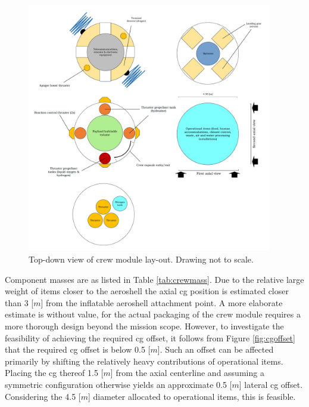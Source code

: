 \begin{figure}[ht]
		\centering
		\includegraphics[width=0.95\textwidth]{./Figure/CrewModule/TopviewV2.pdf}
		\caption[Top-down view of crew module lay-out]{Top-down view of crew module lay-out. Drawing not to scale.}
		\label{fig:topview}
\end{figure}

Component masses are as listed in Table \ref{tab:crewmass}. Due to the relative large weight of items closer to the aeroshell the axial \gls{cg} position is estimated closer than 3 [$m$] from the inflatable aeroshell attachment point. A more elaborate estimate is without value, for the actual packaging of the crew module requires a more thorough design beyond the mission scope. However, to investigate the feasibility of achieving the required \gls{cg} offset, it follows from Figure \ref{fig:cgoffset} that the required \gls{cg} offset is below 0.5 [$m$]. Such an offset can be affected primarily by shifting the relatively heavy contributions of operational items. Placing the \gls{cg} thereof 1.5 [$m$] from the axial centerline and assuming a symmetric configuration otherwise yields an approximate 0.5 [$m$] lateral \gls{cg} offset. Considering the 4.5 [$m$] diameter allocated to operational items, this is feasible. %

